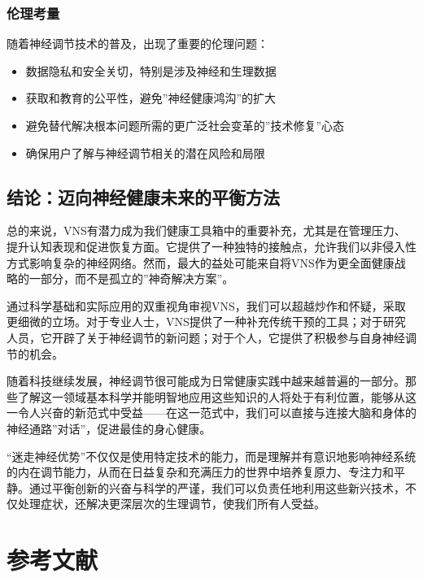 \documentclass[
  Letterpaper,
]{scrbook}
\providecommand{\tightlist}{%
  \setlength{\itemsep}{0pt}\setlength{\parskip}{0pt}}\usepackage{longtable,booktabs,array}
\begin{document}
\subsection{伦理考量}\label{ux4f26ux7406ux8003ux91cf}

随着神经调节技术的普及，出现了重要的伦理问题：

\begin{itemize}
\tightlist
\item
  数据隐私和安全关切，特别是涉及神经和生理数据
\item
  获取和教育的公平性，避免''神经健康鸿沟''的扩大
\item
  避免替代解决根本问题所需的更广泛社会变革的''技术修复''心态
\item
  确保用户了解与神经调节相关的潜在风险和局限
\end{itemize}

\section{结论：迈向神经健康未来的平衡方法}\label{ux7ed3ux8bbaux8fc8ux5411ux795eux7ecfux5065ux5eb7ux672aux6765ux7684ux5e73ux8861ux65b9ux6cd5}

总的来说，VNS有潜力成为我们健康工具箱中的重要补充，尤其是在管理压力、提升认知表现和促进恢复方面。它提供了一种独特的接触点，允许我们以非侵入性方式影响复杂的神经网络。然而，最大的益处可能来自将VNS作为更全面健康战略的一部分，而不是孤立的''神奇解决方案''。

通过科学基础和实际应用的双重视角审视VNS，我们可以超越炒作和怀疑，采取更细微的立场。对于专业人士，VNS提供了一种补充传统干预的工具；对于研究人员，它开辟了关于神经调节的新问题；对于个人，它提供了积极参与自身神经调节的机会。

随着科技继续发展，神经调节很可能成为日常健康实践中越来越普遍的一部分。那些了解这一领域基本科学并能明智地应用这些知识的人将处于有利位置，能够从这一令人兴奋的新范式中受益------在这一范式中，我们可以直接与连接大脑和身体的神经通路''对话''，促进最佳的身心健康。

``迷走神经优势''不仅仅是使用特定技术的能力，而是理解并有意识地影响神经系统的内在调节能力，从而在日益复杂和充满压力的世界中培养复原力、专注力和平静。通过平衡创新的兴奋与科学的严谨，我们可以负责任地利用这些新兴技术，不仅处理症状，还解决更深层次的生理调节，使我们所有人受益。


\chapter*{参考文献}\label{ux53c2ux8003ux6587ux732e}
\end{document}

